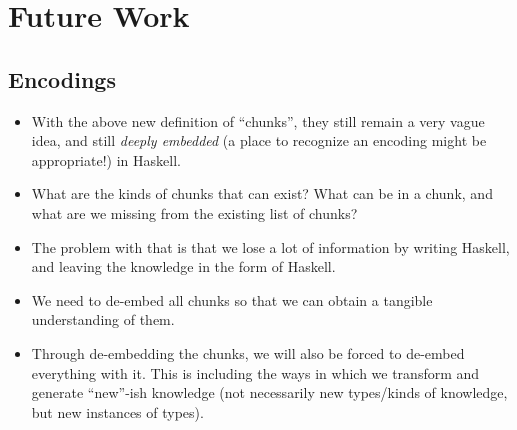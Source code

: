 \section{Future Work}

\subsection{Encodings}

\begin{itemize}

      \item With the above new definition of ``chunks'', they still remain a
            very vague idea, and still \textit{deeply embedded} (a place to
            recognize an encoding might be appropriate!) in Haskell.

      \item What are the kinds of chunks that can exist? What can be in a chunk,
            and what are we missing from the existing list of chunks?

      \item The problem with that is that we lose a lot of information by
            writing Haskell, and leaving the knowledge in the form of Haskell.

      \item We need to de-embed all chunks so that we can obtain a tangible
            understanding of them.

      \item Through de-embedding the chunks, we will also be forced to de-embed
            everything with it. This is including the ways in which we transform
            and generate ``new''-ish knowledge (not necessarily new types/kinds
            of knowledge, but new instances of types).

\end{itemize}


